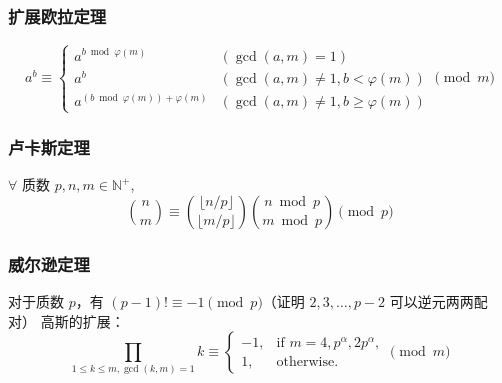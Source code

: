 \subsubsection{扩展欧拉定理}
\begin{equation*}
    a^b \equiv \begin{cases} a^{b \bmod \varphi(m)} & (\gcd(a, m) = 1) \\ a^b & (\gcd(a, m) \ne 1, b < \varphi(m)) \\ a^{(b \bmod \varphi(m)) + \varphi(m)} & (\gcd(a, m) \ne 1, b \ge \varphi(m)) \end{cases} \pmod m
\end{equation*}

\subsubsection{卢卡斯定理}
\noindent $\forall$ 质数 $p, n, m \in \mathbb{N}^{+}$,
\begin{equation*}
    \binom{n}{m} \equiv \binom{\lfloor n/p \rfloor}{\lfloor m/p \rfloor}
    \binom{n \bmod p}{m \bmod p} \pmod p
\end{equation*}

\subsubsection{威尔逊定理}
\noindent 对于质数 $p$，有 $(p-1)! \equiv -1 \pmod p$（证明 $2, 3, \ldots, p -
2$ 可以逆元两两配对）
\noindent 高斯的扩展：
\begin{equation*}
    \prod_{1 \le k \le m, \gcd(k, m) = 1} k \equiv \begin{cases} -1, &
    \text{if } m = 4, p^\alpha, 2p^\alpha, \\ 1, & \text{otherwise}. \end{cases}
    \pmod m
\end{equation*}
